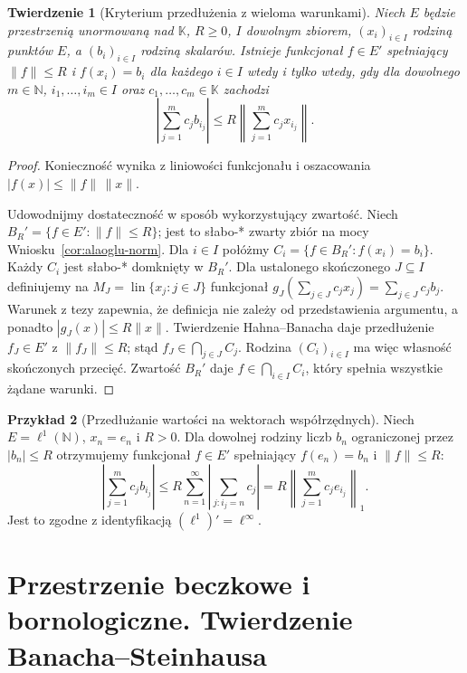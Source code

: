 \documentclass[11pt,a4paper]{article}
\numberwithin{equation}{section}
\theoremstyle{plain}
\newtheorem{twierdzenie}{Twierdzenie}[section]
\theoremstyle{definition}
\newtheorem{przyklad}[twierdzenie]{Przykład}
\theoremstyle{remark}
\newcommand{\N}{\mathbb N}
\newcommand{\K}{\mathbb K}
\begin{document}
\begin{twierdzenie}[Kryterium przedłużenia z wieloma warunkami]
\label{thm:helly-interpolation}
Niech $E$ będzie przestrzenią unormowaną nad $\K$,
$R\ge0$, $I$ dowolnym zbiorem, $(x_i)_{i\in I}$ rodziną
punktów $E$, a $(b_i)_{i\in I}$ rodziną skalarów.
Istnieje funkcjonał $f\in E'$ spełniający
$\|f\|\le R$ i $f(x_i)=b_i$ dla każdego $i\in I$
wtedy i tylko wtedy, gdy dla dowolnego $m\in\N$,
$i_1,\ldots,i_m\in I$ oraz $c_1,\ldots,c_m\in\K$
zachodzi
\[
 \left|\sum_{j=1}^{m}c_jb_{i_j}\right|
 \le R\left\|\sum_{j=1}^{m}c_jx_{i_j}\right\|.
\]
\end{twierdzenie}
\begin{proof}
Konieczność wynika z liniowości funkcjonału i oszacowania
$|f(x)|\le\|f\|\,\|x\|$.

Udowodnijmy dostateczność w sposób wykorzystujący zwartość.
Niech $B_R'=\{f\in E':\|f\|\le R\}$; jest to słabo-* zwarty
zbiór na mocy Wniosku~\ref{cor:alaoglu-norm}. Dla $i\in I$
połóżmy $C_i=\{f\in B_R':f(x_i)=b_i\}$.
Każdy $C_i$ jest słabo-* domknięty w $B_R'$.
Dla ustalonego skończonego $J\subseteq I$ definiujemy
na $M_J=\operatorname{lin}\{x_j:j\in J\}$ funkcjonał
$g_J(\sum_{j\in J}c_jx_j)=\sum_{j\in J}c_jb_j$.
Warunek z tezy zapewnia, że definicja nie zależy od
przedstawienia argumentu, a ponadto $|g_J(x)|\le R\|x\|$.
Twierdzenie Hahna--Banacha daje przedłużenie
$f_J\in E'$ z $\|f_J\|\le R$; stąd
$f_J\in\bigcap_{j\in J} C_j$.
Rodzina $(C_i)_{i\in I}$ ma więc własność skończonych przecięć.
Zwartość $B_R'$ daje $f\in\bigcap_{i\in I}C_i$,
który spełnia wszystkie żądane warunki.
\end{proof}

\begin{przyklad}[Przedłużanie wartości na wektorach współrzędnych]
Niech $E=\ell^1(\N)$, $x_n=e_n$ i $R>0$.
Dla dowolnej rodziny liczb $b_n$ ograniczonej przez
$|b_n|\le R$ otrzymujemy funkcjonał $f\in E'$
spełniający $f(e_n)=b_n$ i $\|f\|\le R$:
\[
 \left|\sum_{j=1}^m c_jb_{i_j}\right|
 \le R\sum_{n=1}^\infty
       \left|\sum_{j:i_j=n}c_j\right|
 =R\left\|\sum_{j=1}^m c_je_{i_j}\right\|_1.
\]
Jest to zgodne z identyfikacją $(\ell^1)'=\ell^\infty$.
\end{przyklad}


\setcounter{section}{9}
\section{Przestrzenie beczkowe i bornologiczne. Twierdzenie Banacha--Steinhausa}\label{sec:beczkowe-bornologiczne}
\end{document}
